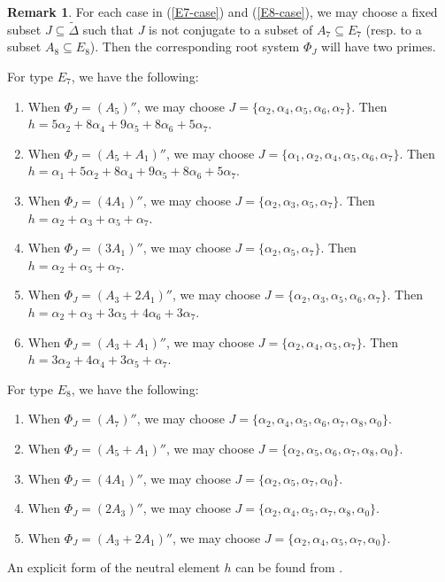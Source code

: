 \documentclass[reqno,12pt]{amsart}
\numberwithin{equation}{section}
\theoremstyle{plain}
\theoremstyle{definition}
\newtheorem{Rem}[Thm]{Remark}
\renewcommand{\subset}{\subseteq}
\begin{document}
\begin{Rem}
    For each case in (\ref{E7-case}) and (\ref{E8-case}), we may choose a fixed subset $J \subset \tilde{\Delta}$ such that $J$ is not conjugate to a subset of $A_7\subset E_7$ (resp. to a subset $A_8\subset E_8$). Then the corresponding root system $\Phi_J$ will have two primes.

    For type $E_7$, we have the following:
    \begin{enumerate}
        \item When $\Phi_J=(A_5)''$, we may choose $J=\{\alpha_2,\alpha_4,\alpha_5,\alpha_6,\alpha_7\}$. Then $h=5\alpha_2+8\alpha_4+9\alpha_5+8\alpha_6+5\alpha_7$.
        \item When $\Phi_J=(A_5+A_1)''$, we may choose $J=\{\alpha_1,\alpha_2,\alpha_4,\alpha_5,\alpha_6,\alpha_7\}.$ Then $h=\alpha_1+5\alpha_2+8\alpha_4+9\alpha_5+8\alpha_6+5\alpha_7$.
        \item When $\Phi_J=(4A_1)''$, we may choose $J=\{\alpha_2,\alpha_3,\alpha_5,\alpha_7\}.$ Then $h=\alpha_2+\alpha_3+\alpha_5+\alpha_7$.
        \item When $\Phi_J=(3A_1)''$, we may choose $J=\{\alpha_2,\alpha_5,\alpha_7\}.$ Then $h=\alpha_2+\alpha_5+\alpha_7$.
        \item When $\Phi_J=(A_3+2A_1)''$, we may choose $J=\{\alpha_2,\alpha_3,\alpha_5,\alpha_6,\alpha_7\}.$  Then $h=\alpha_2+\alpha_3+3\alpha_5+4\alpha_6+3\alpha_7$.
        \item When $\Phi_J=(A_3+A_1)''$, we may choose $J=\{\alpha_2,\alpha_4,\alpha_5,\alpha_7\}.$ Then $h=3\alpha_2+4\alpha_4+3\alpha_5+\alpha_7$.
    \end{enumerate}


For type $E_8$, we have the following:
    \begin{enumerate}
        \item When $\Phi_J=(A_7)''$, we may choose $J=\{\alpha_2,\alpha_4,\alpha_5,\alpha_6,\alpha_7,\alpha_8,\alpha_0\}.$
        \item When $\Phi_J=(A_5+A_1)''$, we may choose $J=\{\alpha_2,\alpha_5,\alpha_6,\alpha_7,\alpha_8,\alpha_0\}.$
        \item When $\Phi_J=(4A_1)''$, we may choose $J=\{\alpha_2,\alpha_5,\alpha_7,\alpha_0\}.$ 
        \item When $\Phi_J=(2A_3)''$, we may choose $J=\{\alpha_2,\alpha_4,\alpha_5,\alpha_7,\alpha_8,\alpha_0\}.$
        \item When $\Phi_J=(A_3+2A_1)''$, we may choose $J=\{\alpha_2,\alpha_4,\alpha_5,\alpha_7,\alpha_0\}.$
       
    \end{enumerate}

An explicit form of the neutral element $h$ can be found from \cite[\S 3.6]{CM}.
\end{Rem}
\end{document}
